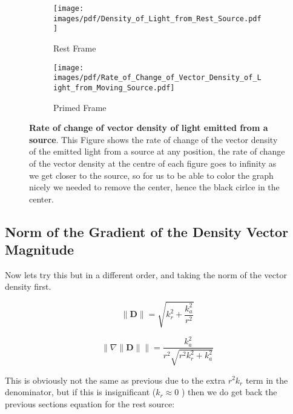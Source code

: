 \begin{figure}[H]
	\centering
	\begin{subfigure}{0.45\textwidth}
		\centering
		\texttt{[image: images/pdf/Density\_of\_Light\_from\_Rest\_Source.pdf]}
		\caption{Rest Frame}
		\label{subfig_1: light emitted from a source's rate of change of vector density}
	\end{subfigure}
	\begin{subfigure}{0.45\textwidth}
		\centering
		\texttt{[image: images/pdf/Rate\_of\_Change\_of\_Vector\_Density\_of\_Light\_from\_Moving\_Source.pdf]}
		\caption{Primed Frame}
		\label{subfig_2: light emitted from a source's rate of change of vector density}
	\end{subfigure}
	\caption{\textbf{Rate of change of vector density of light emitted from a source}. This Figure shows the rate of change of the vector density of the emitted light from a source at any position, the rate of change of the vector density at the centre of each figure goes to infinity as we get closer to the source, so for us to be able to color the graph nicely we needed to remove the center, hence the black cirlce in the center.}
	\label{fig: light emitted from a source's rate of change of vector density}
\end{figure}




\subsection{Norm of the Gradient of the Density Vector Magnitude}\label{subsect: Norm of the Gradient of the Density Vector Magnitude}

Now lets try this but in a different order, and taking the norm of the vector density first.

\begin{equation}
	\| \mathbf{D} \| = \sqrt{k_r^2 + \frac{k_{a}^2}{r^2} }
\end{equation}

\begin{equation}
	\Big\| \nabla \| \mathbf{D} \| \Big\| = \frac{k_{a}^2}{r^2\sqrt{r^2 k_r^2 + k_{a}^2}}
\end{equation}

This is obviously not the same as previous due to the extra $r^2 k_r$ term in the denominator, but if this is insignificant ($k_r\approx 0$ ) then we do get back the previous sections equation for the rest source:


